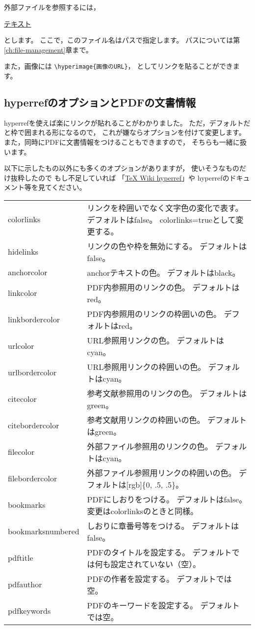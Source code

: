 \documentclass[class=jreport, crop=false, preview=false, dvipdfmx, fleqn]{standalone}
\begin{document}
外部ファイルを参照するには，
\begin{ITeX}
\href{ファイル名}{テキスト}
\end{ITeX}
とします。
ここで，このファイル名はパスで指定します。
パスについては第\ref{ch:file-management}章まで。

また，画像には
\verb|\hyperimage{画像のURL}|，
としてリンクを貼ることができます。


\subsection{hyperrefのオプションとPDFの文書情報}
hyperrefを使えば楽にリンクが貼れることがわかりました。
ただ，デフォルトだと枠で囲まれる形になるので，
これが嫌ならオプションを付けて変更します。
また，同時にPDFに文書情報をつけることもできますので，
そちらも一緒に扱います。

以下に示したもの以外にも多くのオプションがありますが，
使いそうなものだけ抜粋したので
もし不足していれば
「\href{https://texwiki.texjp.org/?hyperref}{TeX Wiki hyperref}」や
hyperrefのドキュメント等を見てください。

\begin{table}[H]
\label{tab:options-of-hyperef}
\begin{center}
\begin{longtable}{lp{}}
colorlinks &
	リンクを枠囲いでなく文字色の変化で表す。
	デフォルトはfalse。
	colorlinks=trueとして変更する。\\
hidelinks &
	リンクの色や枠を無効にする。
	デフォルトはfalse。\\
anchorcolor &
	anchorテキストの色。
	デフォルトはblack。\\
linkcolor &
	PDF内参照用のリンクの色。
	デフォルトはred。\\
linkbordercolor &
	PDF内参照用のリンクの枠囲いの色。
	デフォルトはred。\\
urlcolor &
	URL参照用リンクの色。
	デフォルトはcyan。\\
urlbordercolor &
	URL参照用リンクの枠囲いの色。
	デフォルトはcyan。\\
citecolor &
	参考文献参照用のリンクの色。
	デフォルトはgreen。\\
citebordercolor &
	参考文献用リンクの枠囲いの色。
	デフォルトはgreen。\\
filecolor &
	外部ファイル参照用のリンクの色。
	デフォルトはcyan。\\
filebordercolor &
	外部ファイル参照用リンクの枠囲いの色。
	デフォルトは[rgb]\{0, .5, .5\}。\\
bookmarks &	
	PDFにしおりをつける。
	デフォルトはfalse。
	変更はcolorlinksのときと同様。\\
bookmarksnumbered &
	しおりに章番号等をつける。
	デフォルトはfalse。\\
pdftitle &
	PDFのタイトルを設定する。
	デフォルトでは何も設定されていない（空）。\\
pdfauthor &
	PDFの作者を設定する。
	デフォルトでは空。\\
pdfkeywords &
	PDFのキーワードを設定する。
	デフォルトでは空。
\end{longtable}
\end{center}
\end{table}
\end{document}

